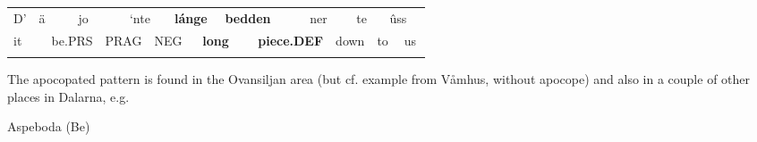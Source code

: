 \begin{tabular}{llllllllllllllllll}
\lsptoprule
D’ & \multicolumn{2}{l}{ä

} & \multicolumn{2}{l}{jo

} & \multicolumn{2}{l}{‘nte

} & \multicolumn{2}{l}{{\bfseries lánge}

} & \multicolumn{2}{l}{{\bfseries bedden}

} & \multicolumn{2}{l}{ner

} & \multicolumn{2}{l}{te

} & \multicolumn{2}{l}{ûss

} & \\
\multicolumn{2}{l}{it

} & \multicolumn{2}{l}{be.PRS

} & \multicolumn{2}{l}{PRAG

} & \multicolumn{2}{l}{NEG

} & \multicolumn{2}{l}{{\bfseries long}

} & \multicolumn{2}{l}{{\bfseries piece.DEF}

} & \multicolumn{2}{l}{down

} & \multicolumn{2}{l}{to

} & \multicolumn{2}{l}{us

}\\
\lspbottomrule
\end{tabular}

The apocopated pattern is found in the Ovansiljan area (but cf. example from Våmhus, without apocope) and also in a couple of other places in Dalarna, e.g.

\begin{listWWNumileveli}
\item 

\begin{styleExample}
Aspeboda (Be)

\end{styleExample}

\end{listWWNumileveli}

